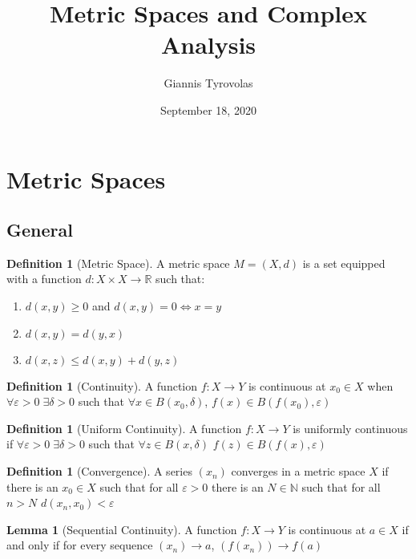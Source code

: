 \documentclass[11pt,a4paper, titlepage]{article}
\title{Metric Spaces and Complex Analysis}
\author{Giannis Tyrovolas}
\date{September 18, 2020}
\theoremstyle{definition}
\newtheorem{definition}[theorem]{Definition}
\newtheorem{lemma}[theorem]{Lemma}
\begin{document}
\maketitle

\section{Metric Spaces}

\subsection{General}

\begin{definition}[Metric Space]
A metric space $M = (X, d)$ is a set equipped with a function $d \colon X \times X \longrightarrow \mathbb{R}$ such that:

\begin{enumerate}
	\item $d(x,y) \geqslant 0 $ and $d(x,y) = 0 \iff x = y$
	\item $d(x,y) = d(y,x)$
	\item $d(x,z) \leqslant d(x,y) + d(y,z)$
\end{enumerate}
\end{definition}

\begin{definition}[Continuity]
A function $f \colon X \longrightarrow Y$ is continuous at $x_0 \in X$ when $\forall \varepsilon > 0 \; \exists \delta > 0$ such that $\forall x \in B(x_0, \delta)$, $f(x) \in B(f(x_0), \varepsilon)$
\end{definition} 

\begin{definition}[Uniform Continuity]
A function $f \colon X \longrightarrow Y$ is uniformly continuous if $\forall \varepsilon >0 \; \exists \delta > 0$ such that $\forall z \in B(x,\delta)$ $f(z) \in B(f(x), \varepsilon)$
\end{definition}

\begin{definition}[Convergence]
A series $(x_n)$ converges in a metric space $X$ if there is an $x_0 \in X$ such that for all $\varepsilon > 0$ there is an $N \in \mathbb{N}$ such that for all $ n > N$ $d(x_n, x_0) < \varepsilon$
\end{definition}

\begin{lemma}[Sequential Continuity]
A function $f \colon X \longrightarrow Y$ is continuous at $a \in X$ if and only if for every sequence $(x_n) \to a$, $(f(x_n)) \to f(a)$
\end{lemma}
\end{document}
